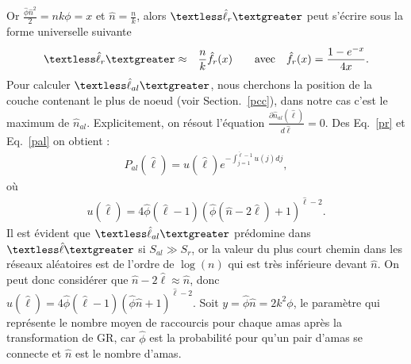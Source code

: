 Or $\frac{\hat{\phi}\hat{n}^2}{2}=nk\phi=x$ et $\hat{n}=\frac{n}{k}$, alors $\textless \hat{\ell}_r \textgreater$ peut s'écrire sous la forme universelle suivante
\begin{eqnarray}
\textless \hat{\ell}_r \textgreater&\approx&\frac{n}{k}\hat{f}_r(x) \quad \quad \textrm{avec} \quad \hat{f}_r(x)=\frac{1-e^{-x}}{4x}.
\label{lr}
\end{eqnarray}
Pour calculer $\textless \hat{\ell}_{al} \textgreater$, nous cherchons la position de la couche contenant le plus de noeud (voir Section.~\ref{pcc}), dans notre cas c'est le maximum de  $\hat{n}_{al}$. Explicitement, on résout l'équation $\frac{\partial \hat{n}_{al}(\hat{\ell})}{d\hat{\ell}}=0$. Des Eq.~\eqref{pr} et Eq.~\eqref{pal} on obtient :
\begin{eqnarray}
P_{al}(\hat{\ell})=u(\hat{\ell})e^{-\int_{j=1}^{\hat{\ell}-1}u(j)dj},
\label{Pal}
\end{eqnarray}
où 
\begin{eqnarray}
u(\hat{\ell})=4\hat{\phi}(\hat{\ell}-1)(\hat{\phi}(\hat{n}-2\hat{\ell})+1)^{\hat{\ell}-2}.
\label{ul}
\end{eqnarray}
Il est évident que $\textless \hat{\ell}_{al} \textgreater$ prédomine dans $\textless \hat{\ell} \textgreater$ si $S_{al}\gg S_r$, or la valeur du plus court chemin dans les réseaux aléatoires est de l'ordre de $\log(n)$ qui est très inférieure devant $\hat{n}$. On peut donc considérer que $\hat{n}-2\hat{\ell}\approx \hat{n}$, donc
$u(\hat{\ell})=4\hat{\phi}(\hat{\ell}-1)(\hat{\phi}\hat{n}+1)^{\hat{\ell}-2}$. Soit  $y=\hat{\phi}\hat{n}=2k^2\phi$, le paramètre qui représente le nombre moyen de raccourcis pour chaque \textsf{amas} après la transformation de GR, car $\hat{\phi}$ est la probabilité pour qu'un pair d'\textsf{\textsf{amas}} se connecte et $\hat{n}$ est le nombre d'\textsf{\textsf{amas}}.\\



